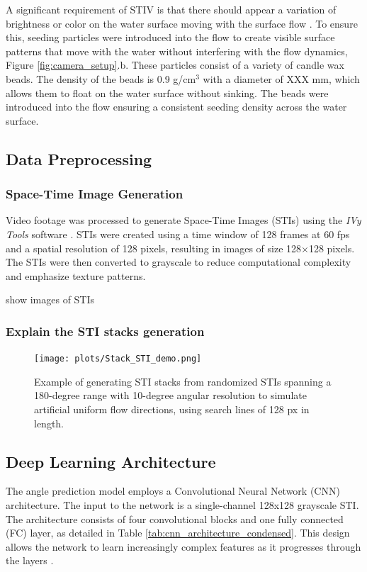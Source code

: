 \documentclass[12pt]{elsarticle}
\begin{document}
A significant requirement of STIV is that there should appear a variation of brightness or color on the water surface moving with the surface flow \cite{fujita2007development}. To ensure this, seeding particles were introduced into the flow to create visible surface patterns that move with the water without interfering with the flow dynamics, Figure \ref{fig:camera_setup}.b. These particles consist of a variety of candle wax beads. The density of the beads is 0.9 g/cm$^3$ with a diameter of XXX mm, which allows them to float on the water surface without sinking. The beads were introduced into the flow ensuring a consistent seeding density across the water surface.
\subsection{Data Preprocessing}
\subsubsection{Space-Time Image Generation}
Video footage was processed to generate Space-Time Images (STIs) using the \textit{IVy Tools} software \cite{engel2025ivytools}. STIs were created using a time window of 128 frames at 60 fps and a spatial resolution of 128 pixels, resulting in images of size 128×128 pixels. The STIs were then converted to grayscale to reduce computational complexity and emphasize texture patterns.

show images of STIs

\subsubsection{Explain the STI stacks generation}

\begin{figure}[!htbp]
    \centering
    \texttt{[image: plots/Stack\_STI\_demo.png]}
    \caption{Example of generating STI stacks from randomized STIs spanning a 180-degree range with 10-degree angular resolution to simulate artificial uniform flow directions, using search lines of 128 px in length.}
    \label{fig:stack_sti_demo}
\end{figure}

\subsection{Deep Learning Architecture}
The angle prediction model employs a Convolutional Neural Network (CNN) architecture. The input to the network is a single-channel 128x128 grayscale STI. The architecture consists of four convolutional blocks and one fully connected (FC) layer, as detailed in Table \ref{tab:cnn_architecture_condensed}. This design allows the network to learn increasingly complex features as it progresses through the layers \cite{zeiler2014visualizing}.
\end{document}
